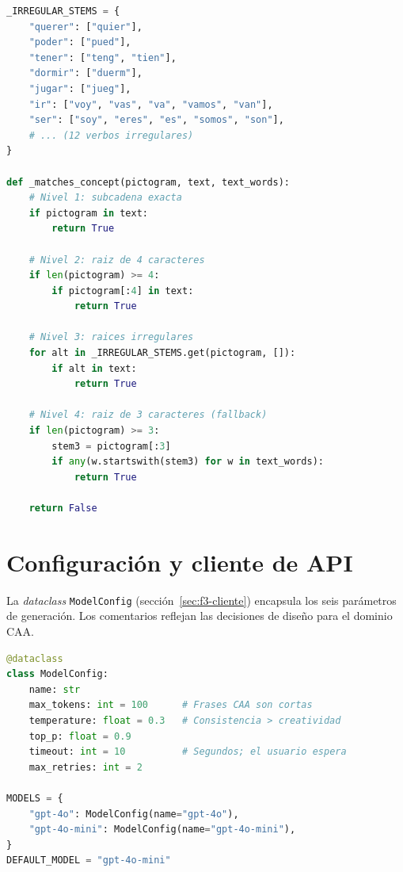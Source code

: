 \begin{lstlisting}[language=Python,caption={Cobertura de conceptos y raíces irregulares (\texttt{response\_validator.py}).},label={lst:concept-coverage},basicstyle=\ttfamily\small,xleftmargin=1cm]
_IRREGULAR_STEMS = {
    "querer": ["quier"],
    "poder": ["pued"],
    "tener": ["teng", "tien"],
    "dormir": ["duerm"],
    "jugar": ["jueg"],
    "ir": ["voy", "vas", "va", "vamos", "van"],
    "ser": ["soy", "eres", "es", "somos", "son"],
    # ... (12 verbos irregulares)
}

def _matches_concept(pictogram, text, text_words):
    # Nivel 1: subcadena exacta
    if pictogram in text:
        return True

    # Nivel 2: raiz de 4 caracteres
    if len(pictogram) >= 4:
        if pictogram[:4] in text:
            return True

    # Nivel 3: raices irregulares
    for alt in _IRREGULAR_STEMS.get(pictogram, []):
        if alt in text:
            return True

    # Nivel 4: raiz de 3 caracteres (fallback)
    if len(pictogram) >= 3:
        stem3 = pictogram[:3]
        if any(w.startswith(stem3) for w in text_words):
            return True

    return False
\end{lstlisting}

\section{Configuración y cliente de API}

La \textit{dataclass} \texttt{ModelConfig} (sección~\ref{sec:f3-cliente}) encapsula los seis parámetros de generación. Los comentarios reflejan las decisiones de diseño para el dominio CAA.

\begin{lstlisting}[language=Python,caption={Configuración de modelos (\texttt{settings.py}).},label={lst:model-config},basicstyle=\ttfamily\small,xleftmargin=1cm]
@dataclass
class ModelConfig:
    name: str
    max_tokens: int = 100      # Frases CAA son cortas
    temperature: float = 0.3   # Consistencia > creatividad
    top_p: float = 0.9
    timeout: int = 10          # Segundos; el usuario espera
    max_retries: int = 2

MODELS = {
    "gpt-4o": ModelConfig(name="gpt-4o"),
    "gpt-4o-mini": ModelConfig(name="gpt-4o-mini"),
}
DEFAULT_MODEL = "gpt-4o-mini"
\end{lstlisting}

